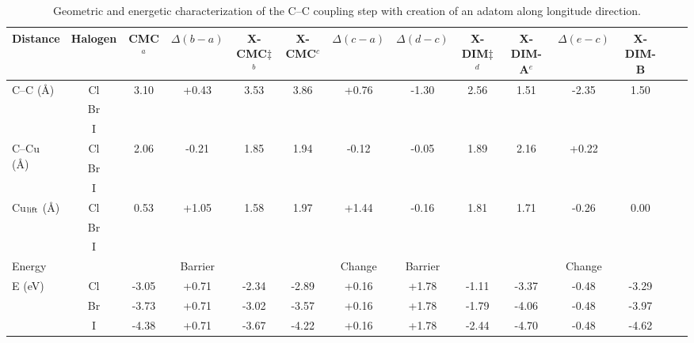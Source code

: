 \documentclass[%
 reprint,
 amsmath,amssymb,
 aps,
prb,
floatfix,
]{revtex4-2}
\begin{document}
\begin{table}
\centering
\begin{tabular}{ lccccccccccccc  }
 \hline
 \hline
 Distance & Halogen & \textbf{CMC}$^{a}$ & $\Delta (b-a)$ & \textbf{X-CMC$\ddagger$}$^{b}$ & \textbf{X-CMC}$^{c}$ &$\Delta (c-a)$ & $\Delta (d-c)$ & \textbf{X-DIM$\ddagger$}$^{d}$ & \textbf{X-DIM-A}$^{e}$ &$\Delta (e-c)$ & \textbf{X-DIM-B}  \\ 
 \hline 
 \multirow{3}{*}{C--C (\si{\angstrom})} & Cl & \multirow{3}{*}{3.10} & \multirow{3}{*}{+0.43} & \multirow{3}{*}{3.53} & \multirow{3}{*}{3.86} &\multirow{3}{*}{+0.76} & \multirow{3}{*}{-1.30} & \multirow{3}{*}{2.56} & \multirow{3}{*}{1.51} &\multirow{3}{*}{-2.35} &\multirow{3}{*}{1.50}\\ 
 & Br & &  &  &  & & & & & &\\ 
 & I & &  &  &  & & & & & &\\ 
 \hline
 \multirow{3}{*}{C--Cu (\si{\angstrom}) } & Cl & \multirow{3}{*}{2.06} & \multirow{3}{*}{-0.21} & \multirow{3}{*}{1.85} & \multirow{3}{*}{1.94} &\multirow{3}{*}{-0.12} & \multirow{3}{*}{-0.05} & \multirow{3}{*}{1.89} & \multirow{3}{*}{2.16} &\multirow{3}{*}{+0.22} &\multirow{3}{*}{} \\ 
 & Br &  &  & & & &  & & & &\\ 
 & I & &  &  & & & & & & & \\ 
 \hline
 \multirow{3}{*}{Cu$_{\rm lift}$ (\si{\angstrom}) } & Cl & \multirow{3}{*}{0.53} & \multirow{3}{*}{+1.05} & \multirow{3}{*}{1.58} & \multirow{3}{*}{1.97} &\multirow{3}{*}{+1.44} & \multirow{3}{*}{-0.16} & \multirow{3}{*}{1.81} & \multirow{3}{*}{1.71} &\multirow{3}{*}{-0.26} &\multirow{3}{*}{0.00}\\ 
 & Br &  &  &  &  & & & &  & &\\ 
 & I & &  &  &  & & & & & &\\ 
 \hline
 \hline
 Energy  & & & Barrier & & & Change & Barrier& & &Change&\\
 \hline
 \multirow{3}{*}{E (\si{\electronvolt}) } & Cl & -3.05 & +0.71 &-2.34 &-2.89 &+0.16 & +1.78 &-1.11 & -3.37&-0.48&-3.29\\ 
 & Br &-3.73 &+0.71 &-3.02 & -3.57 &+0.16 & +1.78 &-1.79 & -4.06 & -0.48&-3.97 \\ 
 & I  & -4.38 & +0.71 & -3.67& -4.22 &+0.16& +1.78 &-2.44 & -4.70 & -0.48&-4.62\\ 
 \hline
 \hline
\end{tabular}
\caption{Geometric and energetic characterization of the C--C coupling step with creation of an adatom along longitude direction.}
\label{table:adatom-longitude}
\end{table}
\end{document}
